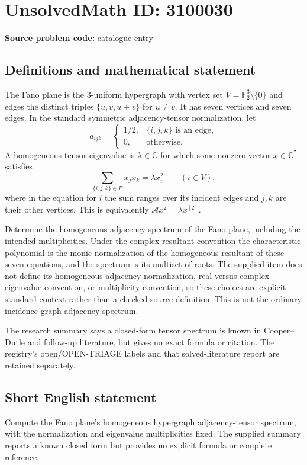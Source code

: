 \documentclass[11pt]{article}
\begin{document}
\section*{UnsolvedMath ID: 3100030}
\textbf{Source problem code:} catalogue entry
\subsection{Definitions and mathematical statement}
The Fano plane is the $3$-uniform hypergraph with vertex set $V=\mathbb F_2^3\setminus\{0\}$ and edges the distinct triples $\{u,v,u+v\}$ for $u\ne v$. It has seven vertices and seven edges. In the standard symmetric adjacency-tensor normalization, let
\[
a_{ijk}=\begin{cases}1/2,&\{i,j,k\}\text{ is an edge},\\0,&\text{otherwise}.\end{cases}
\]
A homogeneous tensor eigenvalue is $\lambda\in\mathbb C$ for which some nonzero vector $x\in\mathbb C^7$ satisfies
\[
\sum_{\{i,j,k\}\in E}x_jx_k=\lambda x_i^2\qquad(i\in V),
\]
where in the equation for $i$ the sum ranges over its incident edges and $j,k$ are their other vertices. This is equivalently $\mathcal A x^2=\lambda x^{[2]}$.

Determine the homogeneous adjacency spectrum of the Fano plane, including the intended multiplicities. Under the complex resultant convention the characteristic polynomial is the monic normalization of the homogeneous resultant of these seven equations, and the spectrum is its multiset of roots. The supplied item does not define its homogeneous-adjacency normalization, real-versus-complex eigenvalue convention, or multiplicity convention, so these choices are explicit standard context rather than a checked source definition. This is not the ordinary incidence-graph adjacency spectrum.

The research summary says a closed-form tensor spectrum is known in Cooper--Dutle and follow-up literature, but gives no exact formula or citation. The registry's open/OPEN-TRIAGE labels and that solved-literature report are retained separately.
\subsection{Short English statement}
Compute the Fano plane's homogeneous hypergraph adjacency-tensor spectrum, with the normalization and eigenvalue multiplicities fixed. The supplied summary reports a known closed form but provides no explicit formula or complete reference.
\end{document}
